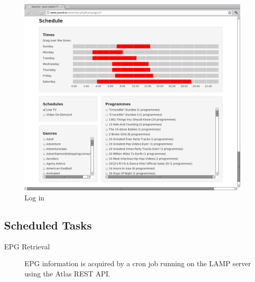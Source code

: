 \begin{figure}[th]
	\centering
	\includegraphics[width=\textwidth]{images/screenshots/advertiser-campaign-schedule.png}
	\caption{Log in}
	\label{fig:advertiser-campaign-schedule}
\end{figure}

\subsection{Scheduled Tasks}\label{subsec:ScheduledTasks}
\begin{description}
\item[EPG Retrieval]{EPG information is acquired by a cron job running on the LAMP server using the Atlas REST API.}
\end{description}